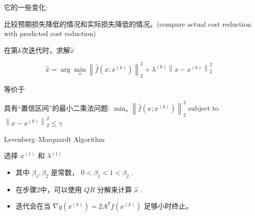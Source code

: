 它的一些变化:

\begin{example}
    比较预期损失降低的情况和实际损失降低的情况。(compare actual cost reduction with predicted cost reduction)
\end{example}

\begin{theorem}
    在第$k$次迭代时，求解$\hat{x}$

    \begin{equation}
    \hat{x}=\arg \min _{x}\left\|\hat{f}\left(x ; x^{(k)}\right)\right\|_{2}^{2}+\lambda^{(k)}\left\|x-x^{(k)}\right\|_{2}^{2}
    \end{equation}

    等价于

    具有“置信区间”的最小二乘法问题:
    $ \min _{x}\left\|\hat{f}\left(x ; x^{(k)}\right)\right\|_{2}^{2} $
    subject to $ \left\|x-x^{(k)}\right\|_{2}^{2} \leq \gamma $
\end{theorem}


\begin{algorithm}[htbp]
    \caption{Levenberg–Marquardt Algorithm}
    选择 $ x^{(1)} $ 和 $ \lambda^{(1)} $\;
\end{algorithm}

\begin{itemize}
    \item 其中 $ \beta_{1}, \beta_{2} $ 是常数， $ 0<\beta_{1}<1<\beta_{2} $ .
    \item 在步骤2中，可以使用 $ {QR} $ 分解来计算 $ \hat{x} $ .
    \item 迭代会在当 $ \nabla g\left(x^{(k)}\right)=2 A^{T} f\left(x^{(k)}\right) $ 足够小时终止。
\end{itemize}

